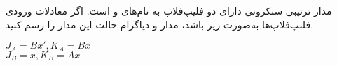 

مدار ترتیبی سنکرونی دارای دو فلیپ‌فلاپ  به نام‌های  و  است. اگر معادلات ورودی فلبپ‌فلاپ‌ها به‌صورت زیر باشد، مدار و دیاگرام حالت این مدار را رسم کنید.

\begin{latin}
	$ J_A=Bx', K_A=Bx $\\
	$ J_B=x, K_B=Ax $
\end{latin}

